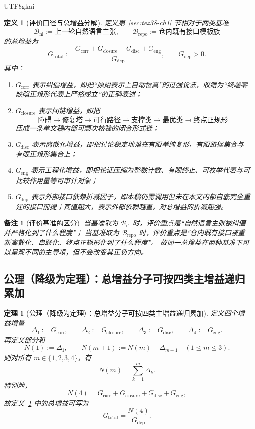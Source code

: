 \documentclass[12pt]{article}
\newtheorem{definition}{定义}[section]
\newtheorem{theorem}{定理}[section]
\newtheorem{remark}{备注}[section]
\begin{document}
\begin{CJK*}{UTF8}{gkai}
\begin{definition}[评价口径与总增益分解]
\label{def:tex38-gain-decomposition}
定义第~\ref{sec:tex38-ch1} 节相对于两类基准
\[
  \mathcal{B}_{\mathrm{nl}}:=\text{上一轮自然语言主张},
  \qquad
  \mathcal{B}_{\mathrm{repo}}:=\text{仓内既有接口模板族}
\]
的总增益为
\[
  G_{\mathrm{total}}
  :=
  \frac{
    G_{\mathrm{corr}}
    +
    G_{\mathrm{closure}}
    +
    G_{\mathrm{disc}}
    +
    G_{\mathrm{eng}}
  }{
    G_{\mathrm{dep}}
  },
  \qquad
  G_{\mathrm{dep}}>0.
\]
其中：
\begin{enumerate}
  \item $G_{\mathrm{corr}}$ 表示\emph{纠偏增益}，即把“原始表示上自动恒真”的过强说法，收缩为“终端零缺陷正规形代表上严格成立”的正确表述；
  \item $G_{\mathrm{closure}}$ 表示\emph{闭链增益}，即把
  \[
    \text{障碍}
    \to
    \text{修复塔}
    \to
    \text{可行路径}
    \to
    \text{支撑类}
    \to
    \text{最优类}
    \to
    \text{终点正规形}
  \]
  压成一条单文稿内部可顺次核验的闭合形式链；
  \item $G_{\mathrm{disc}}$ 表示\emph{离散化增益}，即把讨论稳定地落在有限单纯复形、有限路径集合与有限正规形集合上；
  \item $G_{\mathrm{eng}}$ 表示\emph{工程化增益}，即把论证压缩为整数计数、有限终止、可枚举代表与可比较作用量等可审计对象；
  \item $G_{\mathrm{dep}}$ 表示\emph{外部接口依赖折减因子}，即本稿仍需调用但未在本文内部自底完全重建的接口前提；其值越大，表示外部依赖越重，对总增益的折减越强。
\end{enumerate}
\end{definition}

\begin{remark}[评价基准的区分]
当基准取为 $\mathcal{B}_{\mathrm{nl}}$ 时，评价重点是“自然语言主张被纠偏并严格化到了什么程度”；
当基准取为 $\mathcal{B}_{\mathrm{repo}}$ 时，评价重点是“仓内既有接口被重新离散化、串联化、终点正规形化到了什么程度”。
故同一总增益在两种基准下可以呈现不同的主导项，但不会改变其正负方向。
\end{remark}

\subsection{公理（降级为定理）：总增益分子可按四类主增益递归累加}
\label{subsec:tex38-gain-axiom}

\begin{theorem}[公理（降级为定理）：总增益分子可按四类主增益递归累加]
\label{thm:tex38-gain-recursion}
定义四个增益增量
\[
  \Delta_1:=G_{\mathrm{corr}},\qquad
  \Delta_2:=G_{\mathrm{closure}},\qquad
  \Delta_3:=G_{\mathrm{disc}},\qquad
  \Delta_4:=G_{\mathrm{eng}}.
\]
再定义部分和
\[
  N(1):=\Delta_1,
  \qquad
  N(m+1):=N(m)+\Delta_{m+1}
  \quad(1\le m\le 3).
\]
则对所有 $m\in\{1,2,3,4\}$，有
\[
  N(m)=\sum_{k=1}^{m}\Delta_k.
\]
特别地，
\[
  N(4)
  =
  G_{\mathrm{corr}}
  +
  G_{\mathrm{closure}}
  +
  G_{\mathrm{disc}}
  +
  G_{\mathrm{eng}},
\]
故定义~\ref{def:tex38-gain-decomposition} 中的总增益可写为
\[
  G_{\mathrm{total}}=\frac{N(4)}{G_{\mathrm{dep}}}.
\]
\end{theorem}


\end{CJK*}
\end{document}
